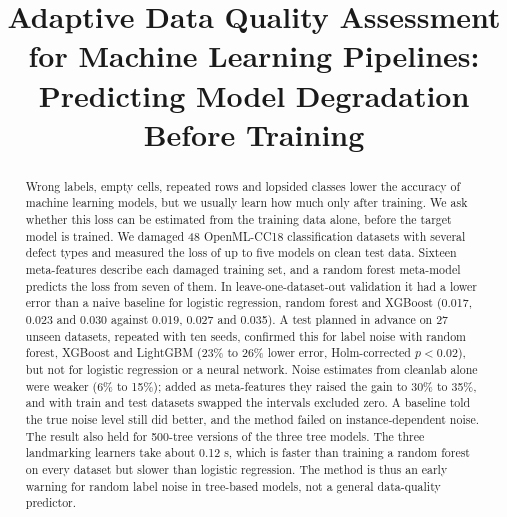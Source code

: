 \documentclass[conference]{IEEEtran}
\begin{document}
\title{Adaptive Data Quality Assessment for Machine Learning Pipelines: Predicting Model Degradation Before Training}

\author{
\and
{}
}

\maketitle

\begin{abstract}
Wrong labels, empty cells, repeated rows and lopsided classes lower the accuracy of machine learning models, but we usually learn how much only after training. We ask whether this loss can be estimated from the training data alone, before the target model is trained. We damaged 48 OpenML-CC18 classification datasets with several defect types and measured the loss of up to five models on clean test data. Sixteen meta-features describe each damaged training set, and a random forest meta-model predicts the loss from seven of them. In leave-one-dataset-out validation it had a lower error than a naive baseline for logistic regression, random forest and XGBoost (0.017, 0.023 and 0.030 against 0.019, 0.027 and 0.035). A test planned in advance on 27 unseen datasets, repeated with ten seeds, confirmed this for label noise with random forest, XGBoost and LightGBM (23\% to 26\% lower error, Holm-corrected $p<0.02$), but not for logistic regression or a neural network. Noise estimates from cleanlab alone were weaker (6\% to 15\%); added as meta-features they raised the gain to 30\% to 35\%, and with train and test datasets swapped the intervals excluded zero. A baseline told the true noise level still did better, and the method failed on instance-dependent noise. The result also held for 500-tree versions of the three tree models. The three landmarking learners take about 0.12 s, which is faster than training a random forest on every dataset but slower than logistic regression. The method is thus an early warning for random label noise in tree-based models, not a general data-quality predictor.
\end{abstract}
\end{document}
